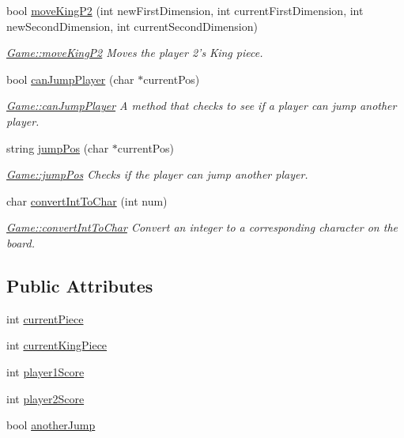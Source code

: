 \begin{DoxyCompactItemize}
bool \hyperlink{class_game_ae89d9850dd157a1ace783ca8785411f3}{move\-King\-P2} (int new\-First\-Dimension, int current\-First\-Dimension, int new\-Second\-Dimension, int current\-Second\-Dimension)
\begin{DoxyCompactList}\small\item\em \hyperlink{class_game_ae89d9850dd157a1ace783ca8785411f3}{Game\-::move\-King\-P2} Moves the player 2's King piece. \end{DoxyCompactList}\item 
bool \hyperlink{class_game_a9e622f6a5fe4c04a0cf2055b3da1c2f2}{can\-Jump\-Player} (char $\ast$current\-Pos)
\begin{DoxyCompactList}\small\item\em \hyperlink{class_game_a9e622f6a5fe4c04a0cf2055b3da1c2f2}{Game\-::can\-Jump\-Player} A method that checks to see if a player can jump another player. \end{DoxyCompactList}\item 
string \hyperlink{class_game_af770bb006101a532326310417011b5e6}{jump\-Pos} (char $\ast$current\-Pos)
\begin{DoxyCompactList}\small\item\em \hyperlink{class_game_af770bb006101a532326310417011b5e6}{Game\-::jump\-Pos} Checks if the player can jump another player. \end{DoxyCompactList}\item 
char \hyperlink{class_game_a6d8b525593305e2a573fc7fc13bca103}{convert\-Int\-To\-Char} (int num)
\begin{DoxyCompactList}\small\item\em \hyperlink{class_game_a6d8b525593305e2a573fc7fc13bca103}{Game\-::convert\-Int\-To\-Char} Convert an integer to a corresponding character on the board. \end{DoxyCompactList}\end{DoxyCompactItemize}
\subsection*{Public Attributes}
\begin{DoxyCompactItemize}
\item 
int \hyperlink{class_game_af6803e417a57dcf56debfd2ecdcc9661}{current\-Piece}
\item 
int \hyperlink{class_game_af0938fa4b54d37a0c3099397a58d3cd7}{current\-King\-Piece}
\item 
int \hyperlink{class_game_a54d8c544103d5721e83e75c0fb42a4a3}{player1\-Score}
\item 
int \hyperlink{class_game_a6ceb54d51da7bfd37492c3ebcea60412}{player2\-Score}
\item 
bool \hyperlink{class_game_aa7bf3272e009587fca6a67b486e27418}{another\-Jump}
\end{DoxyCompactItemize}
